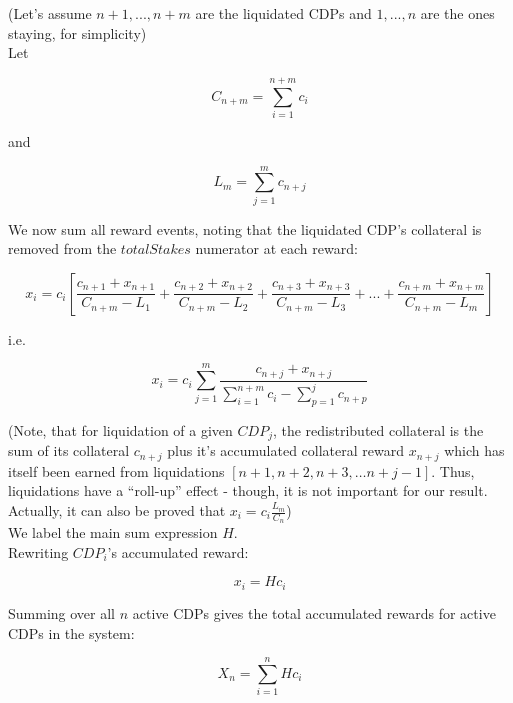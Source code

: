 \documentclass[reqno]{article}
\begin{document}
(Let’s assume $n+1, ..., n+m$ are the liquidated CDPs and $1, ..., n$ are the ones staying, for simplicity)\\

Let

\begin{equation} 
    C_{n+m}=\sum\limits^{n+m}_{i=1}c_i
\end{equation}

\bigskip
and

\begin{equation} 
    L_m=\sum\limits^m_{j=1}c_{n+j}
\end{equation}

\bigskip
We now sum all reward events, noting that the liquidated CDP’s collateral is removed from the $totalStakes$ numerator at each reward:

\begin{equation} 
    x_i=c_i\left[\frac{c_{n+1}+x_{n+1}}{C_{n+m}-L_1}+\frac{c_{n+2}+x_{n+2}}{C_{n+m}-L_2}+\frac{c_{n+3}+x_{n+3}}{C_{n+m}-L_3}+...+\frac{c_{n+m}+x_{n+m}}{C_{n+m}-L_m}\right]
\end{equation}

\bigskip
i.e.

\begin{equation} 
    x_i=c_i\sum\limits^m_{j=1}\frac{c_{n+j}+x_{n+j}}{\sum\limits^{n+m}_{i=1}c_i-\sum\limits^j_{p=1}c_{n+p}}
\end{equation}

\bigskip
(Note, that for liquidation of a given $CDP_j$, the redistributed collateral is the sum of its collateral $c_{n+j}$ plus it’s accumulated collateral reward $x_{n+j}$ which has itself been earned from liquidations $[n+1, n+2, n+3, … n+j-1]$.  Thus, liquidations have a “roll-up” effect - though, it is not important for our result. Actually, it can also be proved that $x_i=c_i\frac{L_m}{C_n}$)\\

We label the main sum expression $H$.\\

Rewriting $CDP_i$’s accumulated reward:

\begin{equation} \label{eq:45}
    x_i=Hc_i
\end{equation}

\bigskip
Summing over all $n$ active CDPs gives the total accumulated rewards for active CDPs in the system:

\begin{equation} 
    X_n=\sum\limits^n_{i=1}Hc_i
\end{equation}
\end{document}
